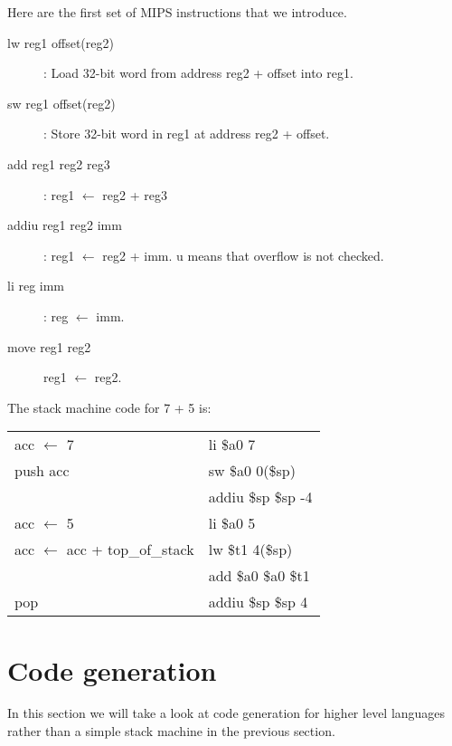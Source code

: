 Here are the first set of MIPS instructions that we introduce.
\begin{description}
\item[lw reg1 offset(reg2)]: Load 32-bit word from address \textsf{reg2 + offset} into \textsf{reg1}. 
\item[sw reg1 offset(reg2)]: Store 32-bit word in \textsf{reg1} at address \textsf{reg2 + offset}.
\item[add reg1 reg2 reg3]: \textsf{reg1 $\leftarrow$ reg2 + reg3}
\item[addiu reg1 reg2 imm]: \textsf{reg1 $\leftarrow$ reg2 + imm. u} means that overflow is not checked.
\item[li reg imm]: \textsf{reg $\leftarrow$ imm}.
\item[move reg1 reg2] reg1 $\leftarrow$ reg2.
\end{description}
The stack machine code for 7 + 5 is: 
\begin{table}[H]
\sf 
\centering
\begin{tabular}{ll}
acc $\leftarrow$ 7  & li \$a0 7 \\
push acc 			& sw \$a0 0(\$sp)\\
					& addiu \$sp \$sp -4 \\
acc $\leftarrow$ 5  & li \$a0 5 \\
acc $\leftarrow$ acc + top\_of\_stack & lw \$t1 4(\$sp) \\
									  & add \$a0 \$a0 \$t1 \\
pop & addiu \$sp \$sp 4
\end{tabular}
\end{table}
\section{Code generation}
In this section we will take a look at code generation for higher level languages rather than a simple stack machine in the previous section.

